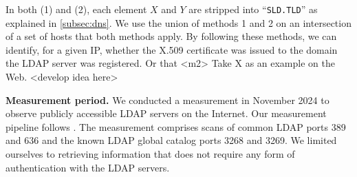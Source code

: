 In both (1) and (2), each element $X$ and $Y$ are stripped into ``\verb|SLD.TLD|'' as explained in \cref{subsec:dns}. We use the union of methods 1 and 2 on an intersection of a set of hosts that both methods apply. By following these methods, we can identify, for a given \gls{IP}, whether the X.509 certificate was issued to the domain the LDAP server was registered. Or that <m2>
Take X as an example on the Web. <develop idea here>

\textbf{Measurement period.}
We conducted a measurement in November 2024 to observe publicly accessible \gls{LDAP} servers on the Internet. 
Our measurement pipeline follows \cite{landscape-anonymous}.
The measurement comprises scans of common \gls{LDAP} ports 389 and 636 and the known \gls{LDAP} global catalog ports 3268 and 3269.
We limited ourselves to retrieving information that does not require any form of authentication with the \gls{LDAP} servers.




